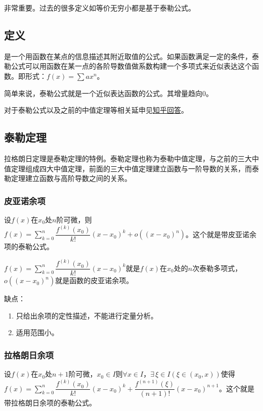 \documentclass[UTF8, 12pt]{ctexart}
\begin{document}
        非常重要。过去的很多定义如等价无穷小都是基于泰勒公式。

        \subsection{定义}

        是一个用函数在某点的信息描述其附近取值的公式。如果函数满足一定的条件，泰勒公式可以用函数在某一点的各阶导数值做系数构建一个多项式来近似表达这个函数。即形式：$f(x)=\sum ax^n$。

        简单来说，泰勒公式就是一个近似表达函数的公式。其增量趋向0。

        对于泰勒公式以及之前的中值定理等相关延申见\href{https://www.zhihu.com/question/25627482}{知乎回答}。

        \subsection{泰勒定理}

        拉格朗日定理是泰勒定理的特例。泰勒定理也称为泰勒中值定理，与之前的三大中值定理组成四大中值定理，前面的三大中值定理建立函数与一阶导数的关系，而泰勒定理建立函数与高阶导数之间的关系。

        \subsubsection{皮亚诺余项}

        设$f(x)$在$x_0$处$n$阶可微，则$f(x)=\sum\limits_{k=0}^n\dfrac{f^{(k)}(x_0)}{k!}(x-x_0)^k+o((x-x_0)^n)$。这个就是带皮亚诺余项的泰勒公式。\medskip

        $f(x)=\sum\limits_{k=0}^n\dfrac{f^{(k)}(x_0)}{k!}(x-x_0)^k$就是$f(x)$在$x_0$处的$n$次泰勒多项式，$o((x-x_0)^n)$就是函数的皮亚诺余项。

        缺点：

        \begin{enumerate}
            \item 只给出余项的定性描述，不能进行定量分析。
            \item 适用范围小。
        \end{enumerate}

        \subsubsection{拉格朗日余项}

        设$f(x)$在$x_0$处$n+1$阶可微，$x_0\in I$则$\forall x\in I$，$\exists\,\xi\in I(\xi\in(x_0,x))$使得$f(x)=\sum\limits_{k=0}^n\dfrac{f^{(k)}(x_0)}{k!}(x-x_0)^k+\dfrac{f^{(n+1)}(\xi)}{(n+1)!}(x-x_0)^{n+1}$。这个就是带拉格朗日余项的泰勒公式。
\end{document}
